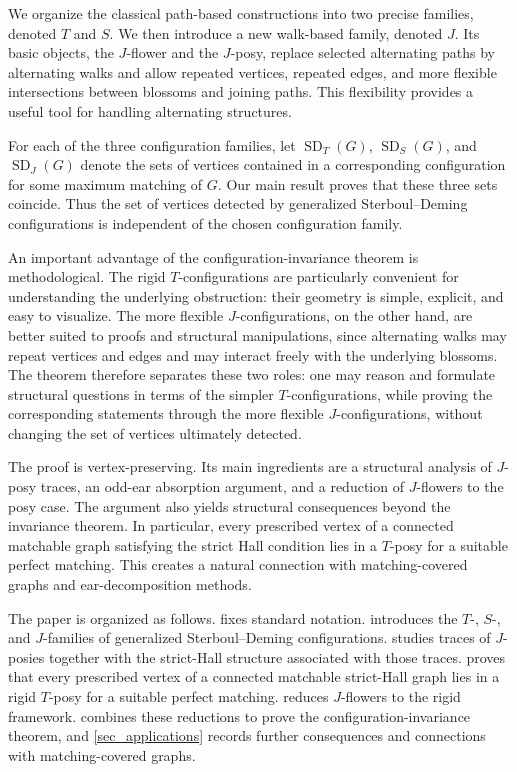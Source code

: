 \documentclass[preprint,12pt]{elsarticle}
\theoremstyle{plain}
\newcommand{\SD}{\operatorname{SD}}
\begin{document}
We organize the classical path-based constructions into two precise families,
denoted \(T\) and \(S\). We then introduce a new walk-based family, denoted
\(J\). Its basic objects, the \(J\)-flower and the \(J\)-posy, replace selected
alternating paths by alternating walks and allow repeated vertices, repeated
edges, and more flexible intersections between blossoms and joining paths. This
flexibility provides a useful tool for handling alternating structures.

For each of the three configuration families, let \(\SD_T(G)\),
\(\SD_S(G)\), and \(\SD_J(G)\) denote the sets of vertices contained in a
corresponding configuration for some maximum matching of \(G\). Our main
result proves that these three sets coincide. Thus the set of vertices
detected by generalized Sterboul--Deming configurations is independent of the
chosen configuration family.

An important advantage of the configuration-invariance theorem is
methodological. The rigid \(T\)-configurations are particularly convenient
for understanding the underlying obstruction: their geometry is simple,
explicit, and easy to visualize. The more flexible \(J\)-configurations, on
the other hand, are better suited to proofs and structural manipulations,
since alternating walks may repeat vertices and edges and may interact freely
with the underlying blossoms. The theorem therefore separates these two
roles: one may reason and formulate structural questions in terms of the
simpler \(T\)-configurations, while proving the corresponding statements
through the more flexible \(J\)-configurations, without changing the set of
vertices ultimately detected.

The proof is vertex-preserving. Its main ingredients are a structural
analysis of \(J\)-posy traces, an odd-ear absorption argument, and a
reduction of \(J\)-flowers to the posy case. The argument also yields
structural consequences beyond the invariance theorem. In particular, every
prescribed vertex of a connected matchable graph satisfying the strict Hall
condition lies in a \(T\)-posy for a suitable perfect matching. This creates
a natural connection with matching-covered graphs and ear-decomposition
methods.

The paper is organized as follows.  fixes standard
notation.  introduces the \(T\)-,
\(S\)-, and \(J\)-families of generalized Sterboul--Deming configurations.
 studies traces of \(J\)-posies together with
the strict-Hall structure associated with those traces. 
proves that every prescribed vertex of
a connected matchable strict-Hall graph lies in a rigid \(T\)-posy for a
suitable perfect matching.  reduces \(J\)-flowers
to the rigid framework.  combines these
reductions to prove the configuration-invariance theorem, and
\cref{sec_applications} records further consequences and connections with
matching-covered graphs.
\end{document}
